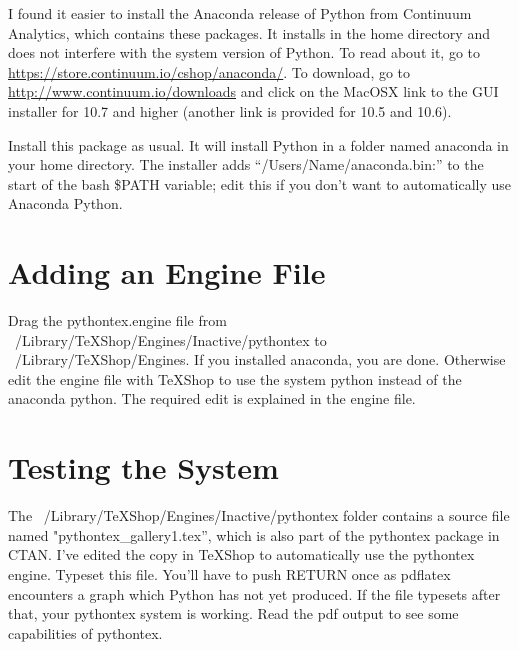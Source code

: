 \documentclass[11pt, oneside]{amsart}
\begin{document}
I found it easier to install the Anaconda release of Python from Continuum Analytics, which contains these packages. It installs in the home directory and does not interfere with the system version of Python. To read about it, go to \href{https://store.continuum.io/cshop/anaconda/}{https://store.continuum.io/cshop/anaconda/}. To download, go to \href{http://www.continuum.io/downloads}{http://www.continuum.io/downloads} and click on the MacOSX link to the GUI installer for 10.7 and higher (another link is provided for 10.5 and 10.6).

Install  this package as usual. It will install Python in a folder named anaconda in your home directory. The installer adds ``/Users/Name/anaconda.bin:'' to the start of the bash \$PATH variable;
edit this if you don't want to automatically use Anaconda Python.

\section{Adding an Engine File}
Drag the pythontex.engine file from ~/Library/TeXShop/Engines/Inactive/pythontex to ~/Library/TeXShop/Engines. If you installed anaconda, you are done. Otherwise edit the engine file with TeXShop to use the system python instead of the anaconda python. The required edit is explained in the engine file.

\section{Testing the System}
The ~/Library/TeXShop/Engines/Inactive/pythontex folder contains a source file named "pythontex\_gallery1.tex'', which is also part of the pythontex package in CTAN. I've edited
the copy in TeXShop to automatically use the pythontex engine. Typeset this file. You'll
have to push RETURN once as pdflatex encounters a graph which Python has not yet produced. If the file
typesets after that, your pythontex system is working. Read the pdf output to see some capabilities of pythontex.
\end{document}
